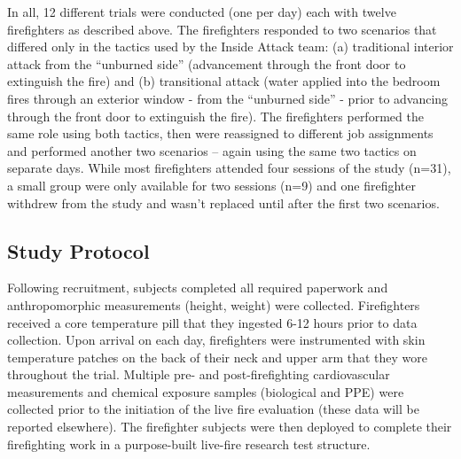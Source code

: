 \documentclass[12pt,oneside]{article}
\begin{document}
In all, 12 different trials were conducted (one per day) each with twelve firefighters as described above.  The firefighters responded to two scenarios that differed only in the tactics used by the Inside Attack team: (a) traditional interior attack from the ``unburned side'' (advancement through the front door to extinguish the fire) and (b) transitional attack (water applied into the bedroom fires through an exterior window - from the ``unburned side'' - prior to advancing through the front door to extinguish the fire).  The firefighters performed the same role using both tactics, then were reassigned to different job assignments and performed another two scenarios -- again using the same two tactics on separate days.  While most firefighters attended four sessions of the study (n=31), a small group were only available for two sessions (n=9) and one firefighter withdrew from the study and wasn't replaced until after the first two scenarios.

\subsection{Study Protocol}
Following recruitment, subjects completed all required paperwork and anthropomorphic measurements (height, weight) were collected.  Firefighters received a core temperature pill that they ingested 6-12 hours prior to data collection. Upon arrival on each day, firefighters were instrumented with skin temperature patches on the back of their neck and upper arm that they wore throughout the trial. Multiple pre- and post-firefighting cardiovascular measurements and chemical exposure samples (biological and PPE) were collected prior to the initiation of the live fire evaluation (these data will be reported elsewhere).  The firefighter subjects were then deployed to complete their firefighting work in a purpose-built live-fire research test structure. 
\end{document}
